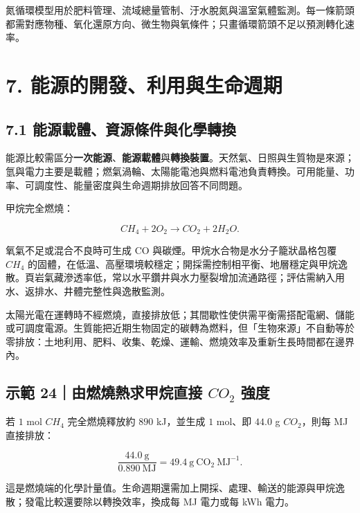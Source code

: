 \documentclass[11pt,a4paper]{article}
\begin{document}
氮循環模型用於肥料管理、流域總量管制、汙水脫氮與溫室氣體監測。每一條箭頭都需對應物種、氧化還原方向、微生物與氧條件；只畫循環箭頭不足以預測轉化速率。

\section{7. 能源的開發、利用與生命週期}\label{ux80fdux6e90ux7684ux958bux767cux5229ux7528ux8207ux751fux547dux9031ux671f}

\subsection{7.1 能源載體、資源條件與化學轉換}\label{ux80fdux6e90ux8f09ux9ad4ux8cc7ux6e90ux689dux4ef6ux8207ux5316ux5b78ux8f49ux63db}

能源比較需區分\textbf{一次能源}、\textbf{能源載體}與\textbf{轉換裝置}。天然氣、日照與生質物是來源；氫與電力主要是載體；燃氣渦輪、太陽能電池與燃料電池負責轉換。可用能量、功率、可調度性、能量密度與生命週期排放回答不同問題。

甲烷完全燃燒：

\[
CH_4+2O_2\rightarrow CO_2+2H_2O.
\]

氧氣不足或混合不良時可生成 CO 與碳煙。甲烷水合物是水分子籠狀晶格包覆 \(CH_4\) 的固體，在低溫、高壓環境較穩定；開採需控制相平衡、地層穩定與甲烷逸散。頁岩氣藏滲透率低，常以水平鑽井與水力壓裂增加流通路徑；評估需納入用水、返排水、井體完整性與逸散監測。

太陽光電在運轉時不經燃燒，直接排放低；其間歇性使供需平衡需搭配電網、儲能或可調度電源。生質能把近期生物固定的碳轉為燃料，但「生物來源」不自動等於零排放：土地利用、肥料、收集、乾燥、運輸、燃燒效率及重新生長時間都在邊界內。

\begin{HandoutWorkedExample}

\subsection{\texorpdfstring{示範 24｜由燃燒熱求甲烷直接 \(CO_2\) 強度}{示範 24｜由燃燒熱求甲烷直接 CO\_2 強度}}\label{ux793aux7bc4-24ux7531ux71c3ux71d2ux71b1ux6c42ux7532ux70f7ux76f4ux63a5-co_2-ux5f37ux5ea6}

若 \(1\) mol \(CH_4\) 完全燃燒釋放約 \(890\) kJ，並生成 \(1\) mol、即 \(44.0\) g \(CO_2\)，則每 MJ 直接排放：

\[
\frac{44.0\ \mathrm g}{0.890\ \mathrm{MJ}}
=49.4\ \mathrm{g\ CO_2\ MJ^{-1}}.
\]

這是燃燒端的化學計量值。生命週期還需加上開採、處理、輸送的能源與甲烷逸散；發電比較還要除以轉換效率，換成每 MJ 電力或每 kWh 電力。

\end{HandoutWorkedExample}
\end{document}
